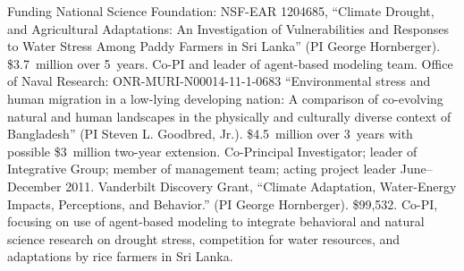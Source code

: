 %
%
\begin{rubric}{Funding}%
\entry
\entry*[2012--2017] National Science Foundation: NSF-EAR 1204685, ``Climate Drought, and Agricultural Adaptations: An Investigation of Vulnerabilities and Responses to Water Stress Among Paddy Farmers in Sri Lanka'' (PI George Hornberger). \$3.7~million over 5~years. Co-PI and leader of agent-based modeling team.
\entry*[2011--2014] Office of Naval Research: ONR-MURI-N00014-11-1-0683 ``Environmental stress and human migration in a low-lying developing nation: A comparison of co-evolving natural and human landscapes in the physically and culturally diverse context of Bangladesh'' (PI Steven L. Goodbred, Jr.). \$4.5~million over 3~years with possible \$3~million two-year extension. Co-Principal Investigator; leader of Integrative Group; member of management team; acting project leader June--December 2011.
\entry*[2011--2013] Vanderbilt Discovery Grant, ``Climate Adaptation, Water-Energy Impacts, Perceptions, and Behavior.'' (PI George Hornberger). \$99,532. Co-PI, focusing on use of agent-based modeling to integrate behavioral and natural science research on drought stress, competition for water resources, and adaptations by rice farmers in Sri Lanka.
\end{rubric}

